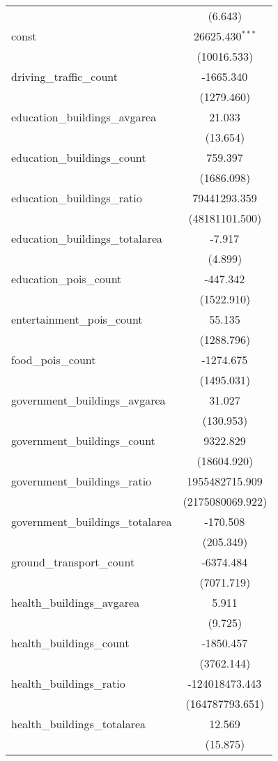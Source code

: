 \begin{table}[!htbp]
\begin{tabular}{@{\extracolsep{5pt}}lc}
  & (6.643) \\
 const & 26625.430$^{***}$ \\
  & (10016.533) \\
 driving_traffic_count & -1665.340$^{}$ \\
  & (1279.460) \\
 education_buildings_avgarea & 21.033$^{}$ \\
  & (13.654) \\
 education_buildings_count & 759.397$^{}$ \\
  & (1686.098) \\
 education_buildings_ratio & 79441293.359$^{}$ \\
  & (48181101.500) \\
 education_buildings_totalarea & -7.917$^{}$ \\
  & (4.899) \\
 education_pois_count & -447.342$^{}$ \\
  & (1522.910) \\
 entertainment_pois_count & 55.135$^{}$ \\
  & (1288.796) \\
 food_pois_count & -1274.675$^{}$ \\
  & (1495.031) \\
 government_buildings_avgarea & 31.027$^{}$ \\
  & (130.953) \\
 government_buildings_count & 9322.829$^{}$ \\
  & (18604.920) \\
 government_buildings_ratio & 1955482715.909$^{}$ \\
  & (2175080069.922) \\
 government_buildings_totalarea & -170.508$^{}$ \\
  & (205.349) \\
 ground_transport_count & -6374.484$^{}$ \\
  & (7071.719) \\
 health_buildings_avgarea & 5.911$^{}$ \\
  & (9.725) \\
 health_buildings_count & -1850.457$^{}$ \\
  & (3762.144) \\
 health_buildings_ratio & -124018473.443$^{}$ \\
  & (164787793.651) \\
 health_buildings_totalarea & 12.569$^{}$ \\
  & (15.875) \\

\end{tabular}
\end{table}
